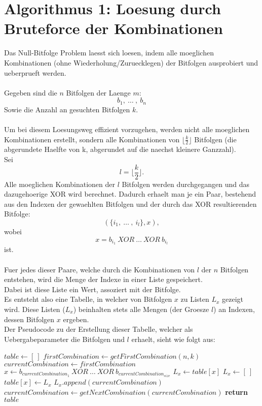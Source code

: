 \documentclass[a4paper,10pt,ngerman]{scrartcl}
\begin{document}
\section{Algorithmus 1: Loesung durch Bruteforce der Kombinationen}
Das Null-Bitfolge Problem laesst sich loesen, indem alle moeglichen Kombinationen (ohne Wiederholung/Zuruecklegen) der Bitfolgen ausprobiert und ueberprueft werden.
\\\\
Gegeben sind die $n$ Bitfolgen der Laenge $m$:
\[b_1, \ \dots \ , \ b_n\]
Sowie die Anzahl an gesuchten Bitfolgen $k$.
\\
\\Um bei diesem Loesungsweg effizient vorzugehen, werden nicht alle moeglichen Kombinationen erstellt, sondern alle Kombinationen von $\lfloor \frac{k}{2} \rfloor$  Bitfolgen (die abgerundete Haelfte von k, abgerundet auf die naechst kleinere Ganzzahl).\\
Sei 
$$
l = \lfloor \frac{k}{2} \rfloor.
$$
Alle moeglichen Kombinationen der $l$ Bitfolgen werden durchgegangen und das dazugehoerige XOR wird berechnet. Dadurch erhaelt man je ein Paar, bestehend aus den Indexen der gewaehlten Bitfolgen und der durch das XOR resultierenden Bitfolge:
$$
(\{i_1, \ \dots \ , \ i_l \}, x),
$$
wobei
$$
x = b_{i_1} \ XOR \ \dots \ XOR \ b_{i_l}
$$
ist.
\\\\
Fuer jedes dieser Paare, welche durch die Kombinationen von $l$ der $n$ Bitfolgen entstehen, wird die Menge der Indexe in einer Liste gespeichert. \\
Dabei ist diese Liste ein Wert, assoziert mit der Bitfolge.\\
Es entsteht also eine Tabelle, in welcher von Bitfolgen $x$ zu Listen $L_x$ gezeigt wird. Diese Listen ($L_x$) beinhalten stets alle Mengen (der Groesze $l$) an Indexen, dessen Bitfolgen $x$ ergeben.
\\Der Pseudocode zu der Erstellung dieser Tabelle, welcher als Uebergabeparameter die Bitfolgen und $l$ erhaelt, sieht wie folgt aus:
\begin{algorithmic}[1]
		\State $table \gets [ \ ]$
		\State $firstCombination \gets getFirstCombination(n, k)$
		\State $currentCombination \gets firstCombination$
				\State $x \gets b_{currentCombination_1} \ XOR \ \dots \ XOR \ b_{currentCombination_{size}}$
				\State $L_x \gets table[x]$
				 
							\State $L_x \gets [ \ ]$
							\State $table[x] \gets L_x$
				\EndIf
				\State $L_x.append(currentCombination)$
				\State $currentCombination \gets getNextCombination(currentCombination)$
		\EndWhile
		\State \textbf{return} $table$
\EndProcedure
\end{algorithmic}
\end{document}
